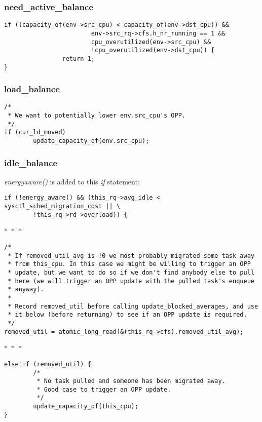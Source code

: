 \documentclass{article}
\newcommand{\divider}{{\begin{center}
  $\ast$~$\ast$~$\ast$
\end{center}}}
\begin{document}
\subsubsection{need\_active\_balance}

\begin{verbatim}
if ((capacity_of(env->src_cpu) < capacity_of(env->dst_cpu)) &&
                        env->src_rq->cfs.h_nr_running == 1 &&
                        cpu_overutilized(env->src_cpu) &&
                        !cpu_overutilized(env->dst_cpu)) {
                return 1;
}
\end{verbatim}

\subsubsection{load\_balance}

\begin{verbatim}
/*
 * We want to potentially lower env.src_cpu's OPP.
 */
if (cur_ld_moved)
        update_capacity_of(env.src_cpu);
\end{verbatim}

\subsubsection{idle\_balance}

\textit{energyaware() }is added to this \textit{if} statement:

\begin{verbatim}
if (!energy_aware() && (this_rq->avg_idle < sysctl_sched_migration_cost || \
        !this_rq->rd->overload)) {
\end{verbatim}
\divider
\begin{verbatim}
/*
 * If removed_util_avg is !0 we most probably migrated some task away
 * from this_cpu. In this case we might be willing to trigger an OPP
 * update, but we want to do so if we don't find anybody else to pull
 * here (we will trigger an OPP update with the pulled task's enqueue
 * anyway).
 *
 * Record removed_util before calling update_blocked_averages, and use
 * it below (before returning) to see if an OPP update is required.
 */
removed_util = atomic_long_read(&(this_rq->cfs).removed_util_avg);
\end{verbatim}
\divider
\begin{verbatim}
else if (removed_util) {
        /*
         * No task pulled and someone has been migrated away.
         * Good case to trigger an OPP update.
         */
        update_capacity_of(this_cpu);
}
\end{verbatim}
\end{document}
